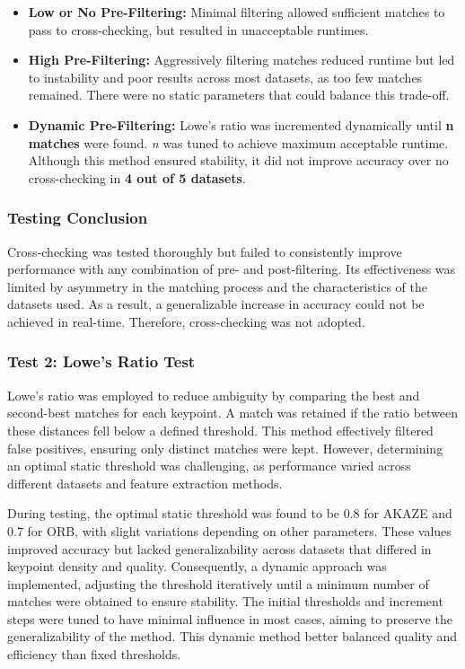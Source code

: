 \begin{itemize}
    \item \textbf{Low or No Pre-Filtering:}  
    Minimal filtering allowed sufficient matches to pass to cross-checking, but resulted in unacceptable runtimes.

    \item \textbf{High Pre-Filtering:}  
    Aggressively filtering matches reduced runtime but led to instability and poor results across most datasets, as too few matches remained. There were no static parameters that could balance this trade-off.

    \item \textbf{Dynamic Pre-Filtering:}  
    Lowe’s ratio was incremented dynamically until \textbf{n matches} were found. \textit{n} was tuned to achieve maximum acceptable runtime. Although this method ensured stability, it did not improve accuracy over no cross-checking in \textbf{4 out of 5 datasets}.
\end{itemize}

\subsubsection{Testing Conclusion}
Cross-checking was tested thoroughly but failed to consistently improve performance with any combination of pre- and post-filtering. Its effectiveness was limited by asymmetry in the matching process and the characteristics of the datasets used. As a result, a generalizable increase in accuracy could not be achieved in real-time. Therefore, cross-checking was not adopted. 




\subsubsection{Test 2: Lowe’s Ratio Test}  

Lowe’s ratio was employed to reduce ambiguity by comparing the best and second-best matches for each keypoint. A match was retained if the ratio between these distances fell below a defined threshold. This method effectively filtered false positives, ensuring only distinct matches were kept. However, determining an optimal static threshold was challenging, as performance varied across different datasets and feature extraction methods.

During testing, the optimal static threshold was found to be 0.8 for AKAZE and 0.7 for ORB, with slight variations depending on other parameters. These values improved accuracy but lacked generalizability across datasets that differed in keypoint density and quality. Consequently, a dynamic approach was implemented, adjusting the threshold iteratively until a minimum number of matches were obtained to ensure stability. The initial thresholds and increment steps were tuned to have minimal influence in most cases, aiming to preserve the generalizability of the method. This dynamic method better balanced quality and efficiency than fixed thresholds.

